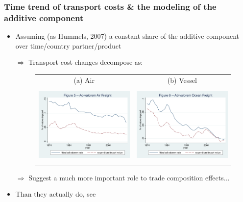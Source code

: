 \documentclass[10 pt,Helvetica, french]{beamer}
\begin{document}
\begin{frame}[label = app_compeffects_results]
\frametitle{Time trend of transport costs \& the modeling of the additive component}

\begin{itemize}
\item Assuming (as Hummels, 2007) a constant share of the additive component over time/country partner/product
\item[$\Rightarrow$] Transport cost changes decompose as:
\begin{figure}[htbp]
\begin{center}
\begin{tabular}{cc}
{\footnotesize (a) Air } & {\footnotesize (b) Vessel}\\
\includegraphics[width=5cm, height=4cm]{figure5_comme_hummels_air.pdf}
& \includegraphics[width=5cm,height=4cm]{figure6_comme_hummels_ocean.pdf} \\
\end{tabular}
\end{center}
\end{figure}
\item[$\Rightarrow$] Suggest a much more important role to trade composition effects...  \vspace{0.1cm}
\item Than they actually do, see \hyperlink{slide_compeffects_figure}{}
\end{itemize}


\hyperlink{slide_compeffects_results}{}
\end{frame}
\end{document}
